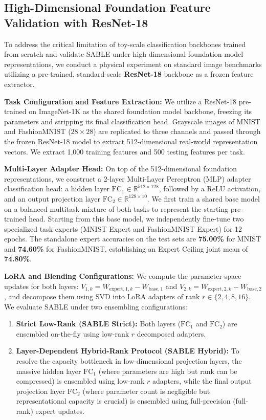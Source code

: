 \subsection{High-Dimensional Foundation Feature Validation with ResNet-18}
To address the critical limitation of toy-scale classification backbones trained from scratch and validate SABLE under high-dimensional foundation model representations, we conduct a physical experiment on standard image benchmarks utilizing a pre-trained, standard-scale \textbf{ResNet-18} backbone as a frozen feature extractor.

\textbf{Task Configuration and Feature Extraction:} We utilize a ResNet-18 pre-trained on ImageNet-1K as the shared foundation model backbone, freezing its parameters and stripping its final classification head. Grayscale images of MNIST and FashionMNIST ($28\times 28$) are replicated to three channels and passed through the frozen ResNet-18 model to extract 512-dimensional real-world representation vectors. We extract 1,000 training features and 500 testing features per task. 

\textbf{Multi-Layer Adapter Head:} On top of the 512-dimensional foundation representations, we construct a 2-layer Multi-Layer Perceptron (MLP) adapter classification head: a hidden layer $\text{FC}_1 \in \mathbb{R}^{512 \times 128}$, followed by a ReLU activation, and an output projection layer $\text{FC}_2 \in \mathbb{R}^{128 \times 10}$. We first train a shared base model on a balanced multitask mixture of both tasks to represent the starting pre-trained head. Starting from this base model, we independently fine-tune two specialized task experts (MNIST Expert and FashionMNIST Expert) for 12 epochs. The standalone expert accuracies on the test sets are \textbf{75.00\%} for MNIST and \textbf{74.60\%} for FashionMNIST, establishing an Expert Ceiling joint mean of \textbf{74.80\%}.

\textbf{LoRA and Blending Configurations:} We compute the parameter-space updates for both layers: $V_{1, k} = W_{\text{expert}, 1, k} - W_{\text{base}, 1}$ and $V_{2, k} = W_{\text{expert}, 2, k} - W_{\text{base}, 2}$, and decompose them using SVD into LoRA adapters of rank $r \in \{2, 4, 8, 16\}$. We evaluate SABLE under two ensembling configurations:
\begin{enumerate}
    \item \textbf{Strict Low-Rank (SABLE Strict):} Both layers ($\text{FC}_1$ and $\text{FC}_2$) are ensembled on-the-fly using low-rank $r$ decomposed adapters.
    \item \textbf{Layer-Dependent Hybrid-Rank Protocol (SABLE Hybrid):} To resolve the capacity bottleneck in low-dimensional projection layers, the massive hidden layer $\text{FC}_1$ (where parameters are high but rank can be compressed) is ensembled using low-rank $r$ adapters, while the final output projection layer $\text{FC}_2$ (where parameter count is negligible but representational capacity is crucial) is ensembled using full-precision (full-rank) expert updates.
\end{enumerate}

